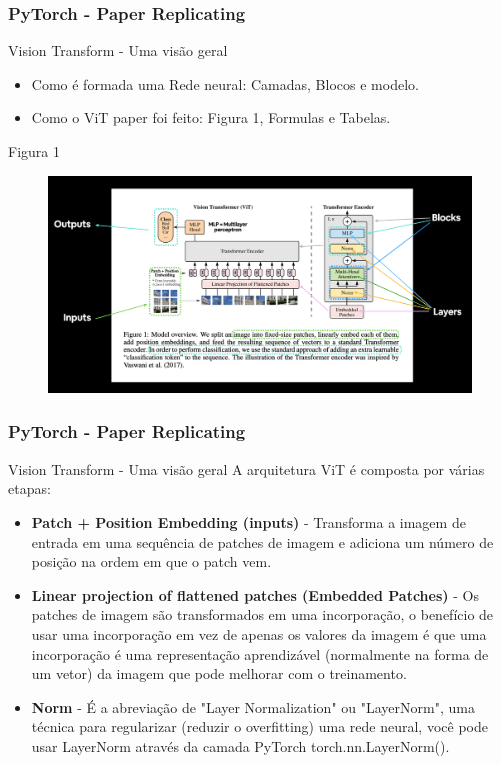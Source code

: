 \documentclass{beamer}
\begin{document}
\begin{frame}
	\frametitle{PyTorch - Paper Replicating}
	\begin{block}{Vision Transform - Uma visão geral}
		\begin{itemize}
			\item Como é formada uma Rede neural: Camadas, Blocos e modelo.
			\item Como o ViT paper foi feito: Figura 1, Formulas e Tabelas.
		\end{itemize}
	\end{block}
	\begin{block}{Figura 1}
		\begin{figure}
			\centering
			\includegraphics[width=0.7\linewidth]{figures/vit_fig_1}
		\end{figure}
	
	\end{block}
\end{frame} 
\begin{frame}
	\frametitle{PyTorch - Paper Replicating}
	\begin{block}{Vision Transform - Uma visão geral}
		A arquitetura ViT é composta por várias etapas:
		\begin{itemize}
			\item \textbf{Patch + Position Embedding (inputs)} - Transforma a imagem de entrada em uma sequência de patches de imagem e adiciona um número de posição na ordem em que o patch vem.
			\item \textbf{Linear projection of flattened patches (Embedded Patches)} - Os patches de imagem são transformados em uma incorporação, o benefício de usar uma incorporação em vez de apenas os valores da imagem é que uma incorporação é uma representação aprendizável (normalmente na forma de um vetor) da imagem que pode melhorar com o treinamento.
			\item \textbf{Norm} - É a abreviação de "Layer Normalization" ou "LayerNorm", uma técnica para regularizar (reduzir o overfitting) uma rede neural, você pode usar LayerNorm através da camada PyTorch torch.nn.LayerNorm().
		\end{itemize}
	\end{block}
\end{frame}
\end{document}
